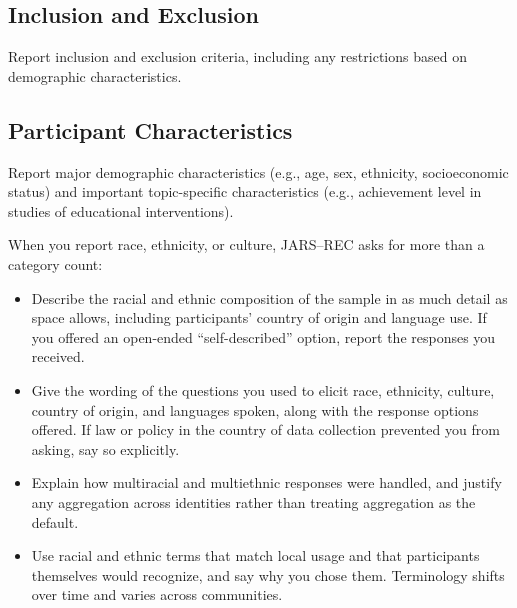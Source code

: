 \documentclass[acmsmall,screen,anonymous,review]{acmart}
\begin{document}
\subsection{Inclusion and Exclusion}
Report inclusion and exclusion criteria, including any restrictions based on demographic characteristics.

\subsection{Participant Characteristics}
Report major demographic characteristics (e.g., age, sex, ethnicity, socioeconomic status) and important topic-specific characteristics (e.g., achievement level in studies of educational interventions).



When you report race, ethnicity, or culture, JARS--REC asks for more than a category count:
\begin{itemize}
    \item Describe the racial and ethnic composition of the sample in as much detail as space allows, including participants' country of origin and language use. If you offered an open-ended ``self-described'' option, report the responses you received.
    \item Give the wording of the questions you used to elicit race, ethnicity, culture, country of origin, and languages spoken, along with the response options offered. If law or policy in the country of data collection prevented you from asking, say so explicitly.
    \item Explain how multiracial and multiethnic responses were handled, and justify any aggregation across identities rather than treating aggregation as the default.
    \item Use racial and ethnic terms that match local usage and that participants themselves would recognize, and say why you chose them. Terminology shifts over time and varies across communities.
\end{itemize}
\end{document}
